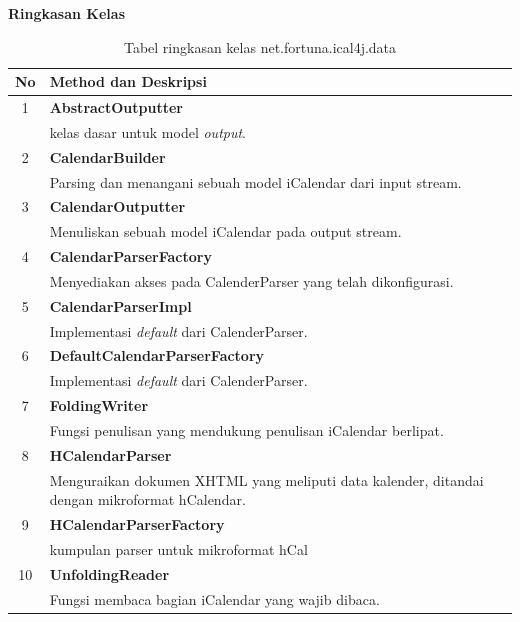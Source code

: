 	\noindent \textbf{Ringkasan Kelas}
	\begin{table}[H]
		\centering
		\caption{Tabel ringkasan kelas net.fortuna.ical4j.data}
		\label{tab:kelas_net.fortuna.ical4j.data}
	\begin{tabular}{|c|p{12cm}|}
		\hline
		\textbf{No} & \textbf{Method dan Deskripsi} \\ \hline \hline
		1 & \textbf{AbstractOutputter}\\
			&	kelas dasar untuk model \textit{output}.\\ \hline
		2 & \textbf{CalendarBuilder}\\
			&	Parsing dan menangani sebuah model iCalendar dari input stream.\\ \hline
		3 & \textbf{CalendarOutputter}\\
			&	Menuliskan sebuah model iCalendar pada output stream.\\ \hline
		4 & \textbf{CalendarParserFactory}\\
			&	Menyediakan akses pada CalenderParser yang telah dikonfigurasi.\\ \hline
		5 & \textbf{CalendarParserImpl}\\
			&	Implementasi \textit{default} dari CalenderParser.\\ \hline
		6 & \textbf{DefaultCalendarParserFactory	
}\\
			&	Implementasi \textit{default} dari CalenderParser.\\ \hline
		7 & \textbf{FoldingWriter}\\
			&	Fungsi penulisan yang mendukung penulisan iCalendar berlipat.\\ \hline
		8 & \textbf{HCalendarParser}\\
			&	Menguraikan dokumen XHTML yang meliputi data kalender, ditandai dengan mikroformat hCalendar.\\ \hline
		9 & \textbf{HCalendarParserFactory}\\
			&	kumpulan parser untuk mikroformat hCal\\ \hline
		10 & \textbf{UnfoldingReader}\\
			&	Fungsi membaca bagian iCalendar yang wajib dibaca.\\ \hline
	\end{tabular}
\end{table}
	
